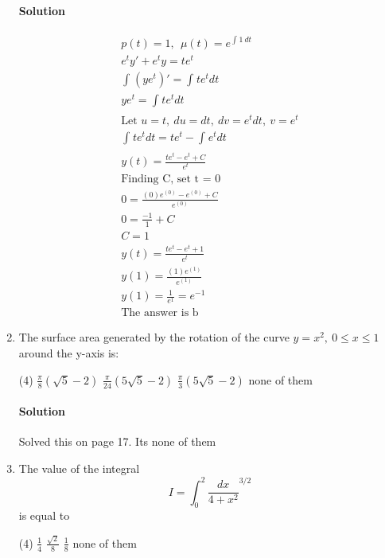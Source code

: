 \documentclass[MATH-115-Notes.tex]{subfiles}
\begin{document}
\begin{enumerate}[itemsep=5mm]
        \paragraph*{Solution}
        \begin{gather*}
            p(t) = 1,\ \ \mu(t)=e^{\int_{}^{}1\ dt}\\
            e^ty' + e^ty = te^t\\
            \int_{}^{}\left( ye^t \right)' = \int_{}^{}te^t dt\\
            ye^t = \int_{}^{}te^t dt\\
            \text{Let } u = t,\ du = dt,\ dv = e^t dt,\ v = e^t\\
            \int_{}^{}te^t dt = te^t - \int_{}^{}e^t dt\\
            y(t) = \frac{te^t - e^t + C}{e^t}\\
            \text{Finding C, set t = 0}\\
            0 = \frac{(0)e^{(0)} - e^{(0)} + C}{e^{(0)}}\\
            0 = \frac{-1}{1} + C\\
            C = 1\\
            y(t) = \frac{te^t - e^t + 1}{e^t}\\
            y(1) = \frac{(1)e^{(1)}}{e^{(1)}}\\
            y(1) = \frac{1}{e^1} = e^{-1}\\
            \text{The answer is b}
        \end{gather*}
        \item The surface area generated by the rotation of the curve $y = x^2,\ 0 \leq x \leq 1$ around the y-axis is:
        \begin{tasks}(4)
            \task $\frac{\pi}{8}(\sqrt{5} - 2)$
            \task $\frac{\pi}{24}(5\sqrt{5} - 2)$
            \task $\frac{\pi}{3}(5\sqrt{5} - 2)$
            \task none of them
        \end{tasks}
        \paragraph*{Solution}
        Solved this on page 17. Its none of them

        \item The value of the integral \[I = \int_{0}^{2}\frac{dx}{4 + x^2}^{3/2}\] is equal to
        \begin{tasks}(4)
            \task \(\frac{1}{4}\)
            \task \(\frac{\sqrt{2}}{8}\)
            \task \(\frac{1}{8}\)
            \task none of them
        \end{tasks}

\end{enumerate}
\end{document}

